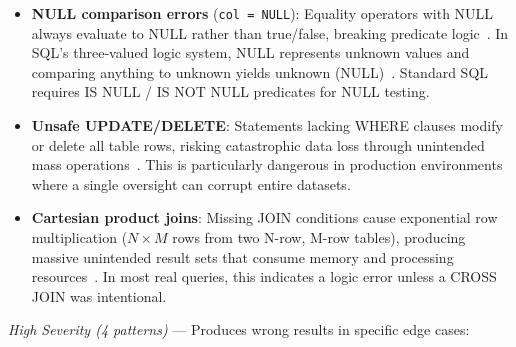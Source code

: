 \documentclass[]{einformatica}
\begin{document}
\begin{itemize}
\item \textbf{NULL comparison errors} (\texttt{col = NULL}): Equality operators with NULL always evaluate to NULL rather than true/false, breaking predicate logic~\cite{karwin2010sqlantipatterns,date2012sqlrelational}. In SQL's three-valued logic system, NULL represents unknown values and comparing anything to unknown yields unknown (NULL)~\cite{date2012sqlrelational,iso9075_2_2016}. Standard SQL requires IS NULL / IS NOT NULL predicates for NULL testing.

\item \textbf{Unsafe UPDATE/DELETE}: Statements lacking WHERE clauses modify or delete all table rows, risking catastrophic data loss through unintended mass operations~\cite{karwin2010sqlantipatterns}. This is particularly dangerous in production environments where a single oversight can corrupt entire datasets.

\item \textbf{Cartesian product joins}: Missing JOIN conditions cause exponential row multiplication ($N \times M$ rows from two N-row, M-row tables), producing massive unintended result sets that consume memory and processing resources~\cite{karwin2010sqlantipatterns,ramakrishnan2003dbms}. In most real queries, this indicates a logic error unless a CROSS JOIN was intentional.
\end{itemize}

\textit{High Severity (4 patterns)} --- Produces wrong results in specific edge cases:
\end{document}
